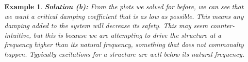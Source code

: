 \documentclass[12pt,letter]{article}
\newtheorem{ex}{Example}
\numberwithin{ex}{section} %
\newenvironment{example}{\begin{mdframed}[middlelinewidth=0.5mm]\begin{ex}\normalfont}{\end{ex}\end{mdframed}}
\numberwithin{re}{section} %
\begin{document}
\begin{example}
					\noindent\textbf{Solution (b):} From the plots we solved for before, we can see that we want a critical damping coefficient that is as low as possible. This means any damping added to the system will decrease its safety. This may seem counter-intuitive, but this is because we are attempting to drive the structure at a frequency higher than its natural frequency, something that does not commonalty happen. Typically excitations for a structure are well below its natural frequency.  			
				
				\end{example}			
		
\end{document}
